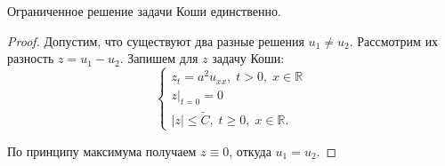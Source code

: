 \begin{conseq}
Ограниченное решение задачи Коши единственно.
\end{conseq}

\begin{proof}
Допустим, что существуют два разные решения $u_1 \not = u_2$. Рассмотрим их разность $ z = u_1 - u_2 $. Запишем для $z$ задачу Коши:
$$\begin{cases}
	z_{t} = a^2 u_{xx}, \; t > 0, \; x \in \mathbb{R}\\
	z|_{t = 0} = 0 \\
    |z| \leq \tilde{C}, \; t \geq 0, \; x \in \mathbb{R}.
\end{cases}$$

По принципу максимума получаем $ z \equiv 0$, откуда $u_1 = u_2$.
\end{proof}


